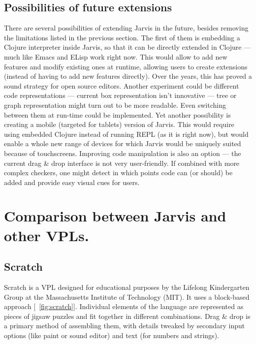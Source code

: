 \documentclass[11pt]{scrartcl}
\newcommand*{\figref}[1]{[\textbf{\figurename}~\ref{#1}]}
\begin{document}
\subsection{Possibilities of future extensions}
There are several possibilities of extending Jarvis in the future, besides
removing the limitations listed in the previous section.
The first of them is embedding a Clojure interpreter inside Jarvis, so that it
can be directly extended in Clojure --- much like Emacs and ELisp work right now.
This would allow to add new features and modify existing ones at runtime,
allowing users to create extensions (instead of having to add new features
directly).
Over the years, this has proved a sound strategy for open source editors.
Another experiment could be different code representations --- current box
representation isn’t innovative --- tree or graph representation might turn out to
be more readable.
Even switching between them at run-time could be implemented.
Yet another possibility is creating a mobile (targeted for tablets) version of
Jarvis.
This would require using embedded Clojure instead of running REPL (as it is
right now), but would enable a whole new range of devices for which Jarvis would
be uniquely suited because of touchscreens.
Improving code manipulation is also an option --- the current drag \& drop
interface is not very user-friendly.
If combined with more complex checkers, one might detect in which points code
can (or should) be added and provide easy visual cues for users.


\section{Comparison between Jarvis and other VPLs.}
\subsection{Scratch}
Scratch is a VPL designed for educational purposes by the Lifelong Kindergarten
Group at the Massachusetts Institute of Technology (MIT).
It uses a block-based approach \figref{fig:scratch}.
Individual elements of the language are represented as pieces of jigsaw puzzles
and fit together in different combinations.
Drag \& drop is a primary method of assembling them, with details tweaked by
secondary input options (like paint or sound editor) and text (for numbers and
strings).
\end{document}
